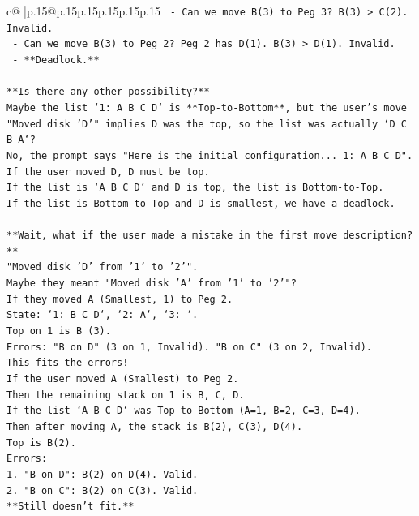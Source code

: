 \documentclass{article}
\begin{document}
{\begin{supertabular}{c@{$\;$}|p{.15\linewidth}@{}p{.15\linewidth}p{.15\linewidth}p{.15\linewidth}p{.15\linewidth}p{.15\linewidth}}
{{{\texttt{  {-} Can we move B(3) to Peg 3? B(3) > C(2). Invalid.} \\
\texttt{  {-} Can we move B(3) to Peg 2? Peg 2 has D(1). B(3) > D(1). Invalid.} \\
\texttt{  {-} **Deadlock.**} \\
\\ 
\texttt{**Is there any other possibility?**} \\
\texttt{Maybe the list `1: A B C D` is **Top{-}to{-}Bottom**, but the user's move "Moved disk 'D'" implies D was the top, so the list was actually `D C B A`?} \\
\texttt{No, the prompt says "Here is the initial configuration... 1: A B C D".} \\
\texttt{If the user moved D, D must be top.} \\
\texttt{If the list is `A B C D` and D is top, the list is Bottom{-}to{-}Top.} \\
\texttt{If the list is Bottom{-}to{-}Top and D is smallest, we have a deadlock.} \\
\\ 
\texttt{**Wait, what if the user made a mistake in the first move description?**} \\
\texttt{"Moved disk 'D' from '1' to '2'".} \\
\texttt{Maybe they meant "Moved disk 'A' from '1' to '2'"?} \\
\texttt{If they moved A (Smallest, 1) to Peg 2.} \\
\texttt{State: `1: B C D`, `2: A`, `3: `.} \\
\texttt{Top on 1 is B (3).} \\
\texttt{Errors: "B on D" (3 on 1, Invalid). "B on C" (3 on 2, Invalid).} \\
\texttt{This fits the errors!} \\
\texttt{If the user moved A (Smallest) to Peg 2.} \\
\texttt{Then the remaining stack on 1 is B, C, D.} \\
\texttt{If the list `A B C D` was Top{-}to{-}Bottom (A=1, B=2, C=3, D=4).} \\
\texttt{Then after moving A, the stack is B(2), C(3), D(4).} \\
\texttt{Top is B(2).} \\
\texttt{Errors:} \\
\texttt{1. "B on D": B(2) on D(4). Valid.} \\
\texttt{2. "B on C": B(2) on C(3). Valid.} \\
\texttt{**Still doesn't fit.**} \\
}}}
\end{supertabular}}
\end{document}
